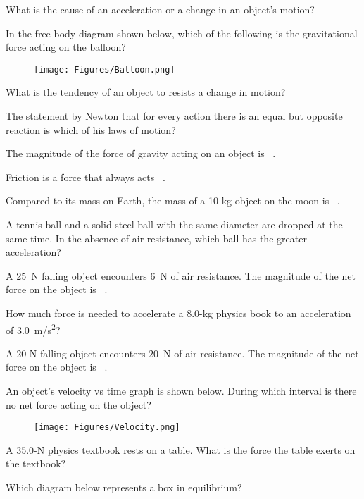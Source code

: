 \documentclass{exam}
\begin{document}
\begin{questions}

\question
What is the cause of an acceleration or a change in an object's motion?

\question
In the free-body diagram shown below, which of the following is the gravitational force acting on the balloon?

\begin{figure}[h!]
    \centering
    \texttt{[image: Figures/Balloon.png]}
\end{figure}

\question
What is the tendency of an object to resists a change in motion?

\question
The statement by Newton that for every action there is an equal but opposite reaction is which of his laws of motion?

\question
The magnitude of the force of gravity acting on an object is \fillin\ .


\question
Friction is a force that always acts \fillin\ .

\question
Compared to its mass on Earth, the mass of a 10-kg object on the moon is \fillin\ .

\question
A tennis ball and a solid steel ball with the same diameter are dropped at the same time. In the absence of air resistance, which ball has the greater acceleration?

\question
A \SI{25}{N} falling object encounters \SI{6}{N} of air resistance. The magnitude of the net force on the object is \fillin\ .

\question
How much force is needed to accelerate a 8.0-kg physics book to an acceleration of \SI{3.0}{m/s^2}?

\question
A 20-N falling object encounters \SI{20}{N} of air resistance. The magnitude of the net force on the object is \fillin\ .

\question
An object's velocity vs time graph is shown below. During which interval is there no net force acting on the object?

\begin{figure}[h!]
    \centering
    \texttt{[image: Figures/Velocity.png]}
\end{figure}

\question
A 35.0-N physics textbook rests on a table. What is the force the table exerts on the textbook?


\clearpage
\question
Which diagram below represents a box in equilibrium?


\end{questions}
\end{document}
